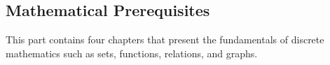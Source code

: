 %
%
%

\begin{partbacktext}
\part{Mathematical Prerequisites}

This part contains four chapters that present the fundamentals of discrete mathematics such as sets, functions, relations, and graphs.

\end{partbacktext}

